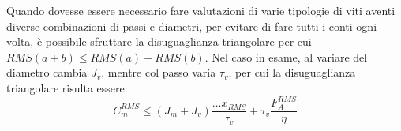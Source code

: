Quando dovesse essere necessario fare valutazioni di varie tipologie di viti aventi diverse combinazioni di passi e diametri, per evitare di fare tutti i conti ogni volta, è possibile sfruttare la disuguaglianza triangolare per cui \(RMS(a+b) \leqslant RMS(a) + RMS(b) \). Nel caso in esame, al variare del diametro cambia \(J_v\), mentre col passo varia \(\tau_v\), per cui la disuguaglianza triangolare risulta essere:
\[ C_m^{RMS} \leqslant (J_m + J_v) \frac{\dots{x}_{RMS}}{\tau_v} + \tau_v \frac{F_A^{RMS}}{\eta} \]